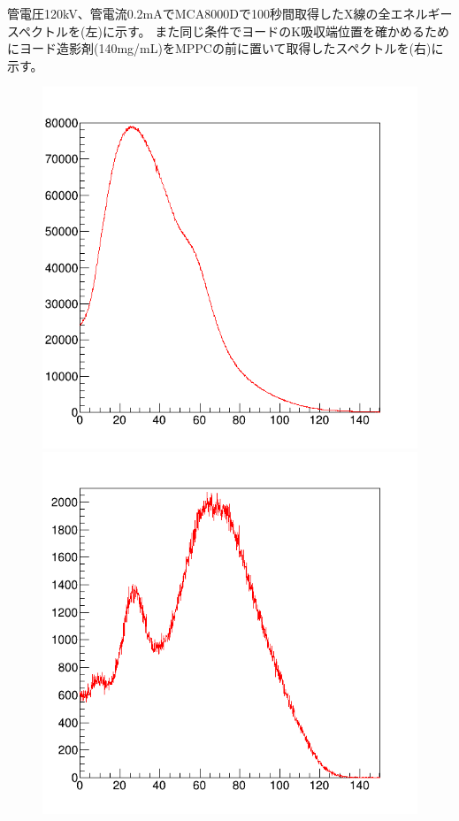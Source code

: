 管電圧120kV、管電流0.2mAでMCA8000Dで100秒間取得したX線の全エネルギースペクトルを(左)に示す。
また同じ条件でヨードのK吸収端位置を確かめるためにヨード造影剤(140mg/mL)をMPPCの前に置いて取得したスペクトルを(右)に示す。

\begin{figure}[H]
 \begin{minipage}{0.5\hsize}
  \begin{center}
 \includegraphics[bb=0.000000 0.000000 596.000000 574.000000,width=1\hsize]{image2/chapter5/all_energy.png} 
  \end{center}
 \end{minipage}
 \begin{minipage}{0.5\hsize}
  \begin{center}
 \includegraphics[bb=0.000000 0.000000 596.000000 574.000000,width=1\hsize]{image2/chapter5/I_kedge_100sec.png} 

\end{center}
\end{minipage}
\end{figure}

